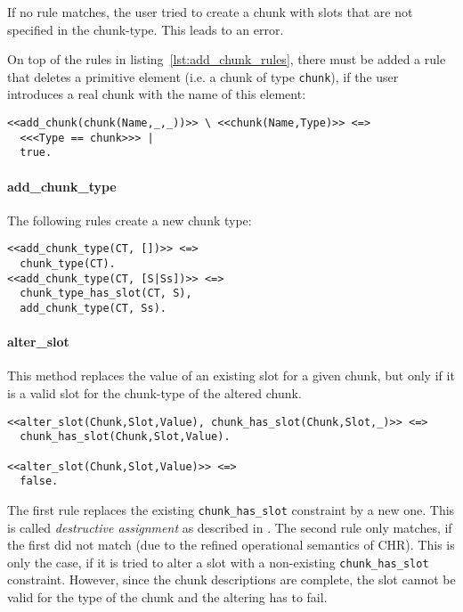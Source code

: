 If no rule matches, the user tried to create a chunk with slots that are not specified in the chunk-type. This leads to an error.

On top of the rules in listing~\ref{lst:add_chunk_rules}, there must be added a rule that deletes a primitive element (i.e. a chunk of type \lstinline|chunk|), if the user introduces a real chunk with the name of this element:

\begin{lstlisting}[caption={Clean up primitive elements}]  
% delete chunk of Type chunk, if real chunk is added
<<add_chunk(chunk(Name,_,_))>> \ <<chunk(Name,Type)>> <=> 
  <<<Type == chunk>>> |
  true.
\end{lstlisting}


\paragraph{add\_chunk\_type}

The following rules create a new chunk type:

\begin{lstlisting}[caption={rules for \texttt{add\_chunk\_type}}]
<<add_chunk_type(CT, [])>> <=> 
  chunk_type(CT).
<<add_chunk_type(CT, [S|Ss])>> <=> 
  chunk_type_has_slot(CT, S), 
  add_chunk_type(CT, Ss).
\end{lstlisting}

\paragraph{alter\_slot}

This method replaces the value of an existing slot for a given chunk, but only if it is a valid slot for the chunk-type of the altered chunk.

\begin{lstlisting}
<<alter_slot(Chunk,Slot,Value), chunk_has_slot(Chunk,Slot,_)>> <=>
  chunk_has_slot(Chunk,Slot,Value).
  
<<alter_slot(Chunk,Slot,Value)>> <=>
  false.
\end{lstlisting}

The first rule replaces the existing \lstinline|chunk_has_slot| constraint by a new one. This is called \emph{destructive assignment} as described in \cite[32]{fru_chr_book_2009}. The second rule only matches, if the first did not match (due to the refined operational semantics of CHR). This is only the case, if it is tried to alter a slot with a non-existing \lstinline|chunk_has_slot| constraint. However, since the chunk descriptions are complete, the slot cannot be valid for the type of the chunk and the altering has to fail.

